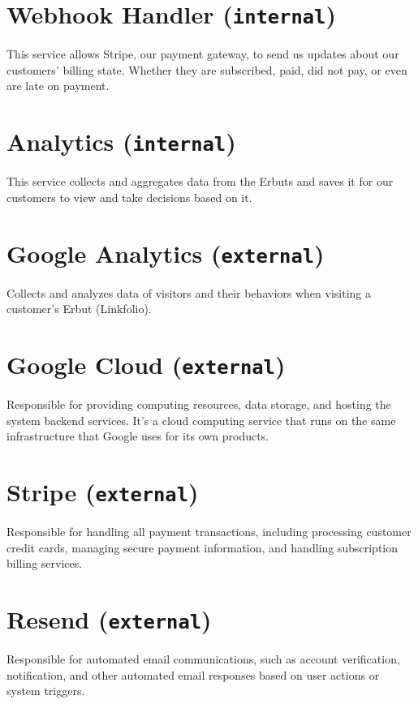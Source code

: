 \documentclass[a4paper]{report}
\begin{document}
\section{Webhook Handler (\texttt{internal})}

This service allows Stripe, our payment gateway, to send us updates about our customers' billing state. Whether they are subscribed, paid, did not pay, or even are late on payment.

\section{Analytics (\texttt{internal})}

This service collects and aggregates data from the Erbuts and saves it for our customers to view and take decisions based on it.

\section{Google Analytics (\texttt{external})}

Collects and analyzes data of visitors and their behaviors when visiting a customer’s Erbut (Linkfolio).

\section{Google Cloud (\texttt{external})}

Responsible for providing computing resources, data storage, and hosting the system backend services. It’s a cloud computing service that runs on the same infrastructure that Google uses for its own products.

\section{Stripe (\texttt{external})}

Responsible for handling all payment transactions, including processing customer credit cards, managing secure payment information, and handling subscription billing services.

\section{Resend (\texttt{external})}

Responsible for automated email communications, such as account verification, notification, and other automated email responses based on user actions or system triggers.
\end{document}
